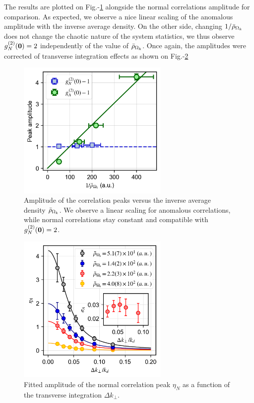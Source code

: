 The results are plotted on Fig.-\ref{fig:amplitude_vs_rhob} alongside the normal correlations amplitude for comparison. As expected, we observe a nice linear scaling of the anomalous amplitude with the inverse average density. On the other side, changing $1/\bar{\rho}_{\Omega_k}$ does not change the chaotic nature of the system statistics, we thus observe $g^{(2)}_N (\bm{0})=2$ independently of the value of $\bar{\rho}_{\Omega_k}$. Once again, the amplitudes were corrected of transverse integration effects as shown on Fig.-\ref{fig:eta_vs_int_kmk}

\begin{figure}
    \centering
    \includegraphics[width=0.65\textwidth]{Fig/Chapter4/amplitude_kmk.png}
    \caption{Amplitude of the correlation peaks versus the inverse average density $\bar{\rho}_{\Omega_k}$. We observe a linear scaling for anomalous correlations, while normal correlations stay constant and compatible with $g^{(2)}_N (\bm{0})=2$.}
    \label{fig:amplitude_vs_rhob}
\end{figure}

\begin{figure}
    \centering
    \includegraphics[width=0.65\textwidth]{Fig/Chapter4/eta_vs_int_kmk.png}
    \caption{Fitted amplitude of the normal correlation peak $\eta_N$ as a function of the transverse integration $\Delta k_{\perp}$.}
    \label{fig:eta_vs_int_kmk}
\end{figure}

